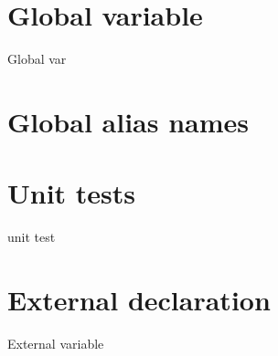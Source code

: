 \section{Global variable}%
\label{sec:global_variables}

Global var

\section{Global alias names}
\label{sec:global_alias_names}

\section{Unit tests}%
\label{sec:unit_test}

unit test

\section{External declaration}%
\label{sec:extern_var}

External variable
